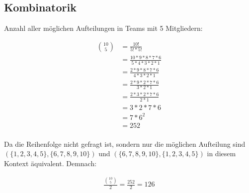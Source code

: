 \documentclass{article}
\begin{document}
\subsection{Kombinatorik}

Anzahl aller möglichen Aufteilungen in Teams mit 5 Mitgliedern:

\begin{align*}
	{10 \choose 5} & = \frac{10!}{5! * 5!}\\
				   & = \frac{10 * 9 * 8 * 7 * 6}{5 * 4 * 3 * 2 * 1}\\
				   & = \frac{2 * 9 * 8 * 7 * 6}{4 * 3 * 2 * 1}\\
				   & = \frac{2 * 9 * 2 * 7 * 6}{3 * 2 * 1}\\
				   & = \frac{2 * 3 * 2 * 7 * 6}{2 * 1}\\
				   & = 3 * 2 * 7 * 6\\
				   & = 7 * 6^2\\
				   & = 252\\
\end{align*}

Da die Reihenfolge nicht gefragt ist, sondern nur die möglichen Aufteilung sind
$(\{1,2,3,4,5\}, \{6,7,8,9,10\})$ und $(\{6,7,8,9,10\}, \{1,2,3,4,5\})$
in diesem Kontext äquivalent. Demnach:

\begin{align*}
	\frac{{10 \choose 5}}{2} = \frac{252}{2} = 126
\end{align*}
\end{document}
